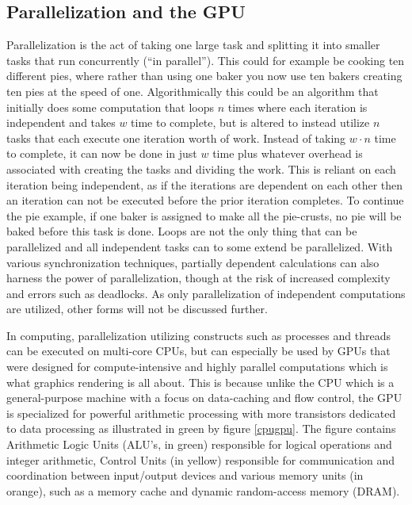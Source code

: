 \subsection{Parallelization and the GPU}\label{subsec:background:parallelization}
Parallelization is the act of taking one large task and splitting it into smaller tasks that run concurrently (``in parallel'').
This could for example be cooking ten different pies, where rather than using one baker you now use ten bakers creating ten pies at the speed of one.
Algorithmically this could be an algorithm that initially does some computation that loops $n$ times where each iteration is independent and takes $w$ time to complete, but is altered to instead utilize $n$ tasks that each execute one iteration worth of work.
Instead of taking $w \cdot n$ time to complete, it can now be done in just $w$ time plus whatever overhead is associated with creating the tasks and dividing the work.
This is reliant on each iteration being independent, as if the iterations are dependent on each other then an iteration can not be executed before the prior iteration completes.
To continue the pie example, if one baker is assigned to make all the pie-crusts, no pie will be baked before this task is done.
Loops are not the only thing that can be parallelized and all independent tasks can to some extend be parallelized. 
With various synchronization techniques, partially dependent calculations can also harness the power of parallelization, though at the risk of increased complexity and errors such as deadlocks.
As only parallelization of independent computations are utilized, other forms will not be discussed further.

In computing, parallelization utilizing constructs such as processes and threads can be executed on multi-core CPUs, but can especially be used by GPUs that were designed for compute-intensive and highly parallel computations which is what graphics rendering is all about.
This is because unlike the CPU which is a general-purpose machine with a focus on data-caching and flow control, the GPU is specialized for powerful arithmetic processing with more transistors dedicated to data processing as illustrated in green by figure \ref{cpugpu}. 
The figure contains Arithmetic Logic Units (ALU's, in green) responsible for logical operations and integer arithmetic, Control Units (in yellow) responsible for communication and coordination between input/output devices and various memory units (in orange), such as a memory cache and dynamic random-access memory (DRAM).

